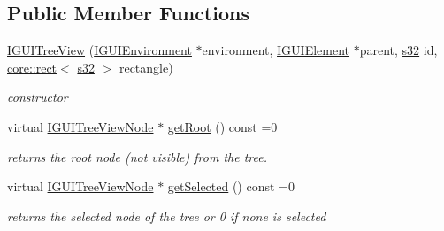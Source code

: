 \subsection*{Public Member Functions}
\begin{DoxyCompactItemize}
\item 
\mbox{\label{classirr_1_1gui_1_1IGUITreeView_a43d973d611542ad77c659167f14aae0d}} 
\hyperlink{classirr_1_1gui_1_1IGUITreeView_a43d973d611542ad77c659167f14aae0d}{I\+G\+U\+I\+Tree\+View} (\hyperlink{classirr_1_1gui_1_1IGUIEnvironment}{I\+G\+U\+I\+Environment} $\ast$environment, \hyperlink{classirr_1_1gui_1_1IGUIElement}{I\+G\+U\+I\+Element} $\ast$parent, \hyperlink{namespaceirr_ac66849b7a6ed16e30ebede579f9b47c6}{s32} id, \hyperlink{classirr_1_1core_1_1rect}{core\+::rect}$<$ \hyperlink{namespaceirr_ac66849b7a6ed16e30ebede579f9b47c6}{s32} $>$ rectangle)
\begin{DoxyCompactList}\small\item\em constructor \end{DoxyCompactList}\item 
\mbox{\label{classirr_1_1gui_1_1IGUITreeView_ad423c84a07a969c786902bf29d736033}} 
virtual \hyperlink{classirr_1_1gui_1_1IGUITreeViewNode}{I\+G\+U\+I\+Tree\+View\+Node} $\ast$ \hyperlink{classirr_1_1gui_1_1IGUITreeView_ad423c84a07a969c786902bf29d736033}{get\+Root} () const =0
\begin{DoxyCompactList}\small\item\em returns the root node (not visible) from the tree. \end{DoxyCompactList}\item 
\mbox{\label{classirr_1_1gui_1_1IGUITreeView_abcdbd869a9e4b6a67ddb94aa4c058c2d}} 
virtual \hyperlink{classirr_1_1gui_1_1IGUITreeViewNode}{I\+G\+U\+I\+Tree\+View\+Node} $\ast$ \hyperlink{classirr_1_1gui_1_1IGUITreeView_abcdbd869a9e4b6a67ddb94aa4c058c2d}{get\+Selected} () const =0
\begin{DoxyCompactList}\small\item\em returns the selected node of the tree or 0 if none is selected \end{DoxyCompactList}\item 
\mbox{\label{classirr_1_1gui_1_1IGUITreeView_a4f03b904367e362ddc4413c46974d32f}} 

\end{DoxyCompactItemize}
